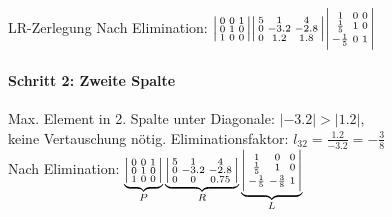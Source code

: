 \begin{example2}{LR-Zerlegung}
Nach Elimination:
$\begin{vsmallmatrix}
0 & 0 & 1\\
0 & 1 & 0\\
1 & 0 & 0
\end{vsmallmatrix} \begin{vsmallmatrix}
5 & 1 & 4\\
0 & -3.2 & -2.8\\
0 & 1.2 & 1.8
\end{vsmallmatrix}
\begin{vsmallmatrix}
1 & 0 & 0\\
\frac{1}{5} & 1 & 0\\
-\frac{1}{5} & 0 & 1
\end{vsmallmatrix}$

\paragraph{Schritt 2: Zweite Spalte}
Max. Element in 2. Spalte unter Diagonale: $|-3.2| > |1.2|$, \\ keine Vertauschung nötig.
Eliminationsfaktor:
$l_{32} = \frac{1.2}{-3.2} = -\frac{3}{8}$
\vspace{2mm}\\
Nach Elimination:
$\underbrace{\begin{vsmallmatrix}
0 & 0 & 1\\
0 & 1 & 0\\
1 & 0 & 0
\end{vsmallmatrix}}_{P} \underbrace{\begin{vsmallmatrix}
5 & 1 & 4\\
0 & -3.2 & -2.8\\
0 & 0 & 0.75
\end{vsmallmatrix}}_{R}
\underbrace{\begin{vsmallmatrix}
1 & 0 & 0\\
\frac{1}{5} & 1 & 0\\
-\frac{1}{5} & -\frac{3}{8} & 1
\end{vsmallmatrix}}_{L}$


\end{example2}
